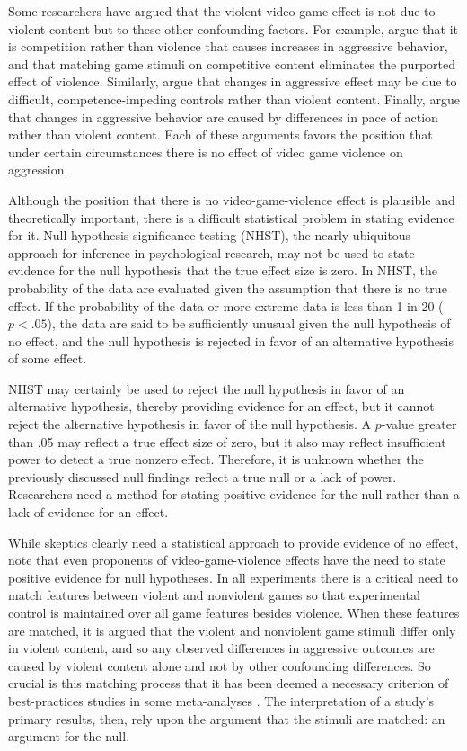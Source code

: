 \documentclass[man]{apa6}
\begin{document}
Some researchers have argued that the violent-video game effect is not due to violent content but to these other confounding factors.  For example, \citet{Adachi:Willoughby:2011} argue that it is competition rather than violence that causes increases in aggressive behavior, and that matching game stimuli on competitive content eliminates the purported effect of violence. Similarly, \citet{Przybylski:etal:2014} argue that changes in aggressive effect may be due to difficult, competence-impeding controls rather than violent content. Finally,  \citet{Elson:etal:2013} argue that changes in aggressive behavior are caused by differences in pace of action rather than violent content. Each of these arguments favors the position that under certain circumstances there is no effect of video game violence on aggression.

Although the position that there is no video-game-violence effect is plausible and theoretically important, there is a difficult statistical problem in stating evidence for it. Null-hypothesis significance testing (NHST), the nearly ubiquitous approach for inference in psychological research, may not be used to state evidence for the null hypothesis that the true effect size is zero.  In NHST, the probability of the data are evaluated given the assumption that there is no true effect. If the probability of the data or more extreme data is less than 1-in-20 ($p<.05$), the data are said to be sufficiently unusual given the null hypothesis of no effect, and the null hypothesis is rejected in favor of an alternative hypothesis of some effect.

NHST may certainly be used to reject the null hypothesis in favor of an alternative hypothesis, thereby providing evidence for an effect, but it cannot reject the alternative hypothesis in favor of the null hypothesis. A $p$-value greater than .05 may reflect a true effect size of zero, but it also may reflect insufficient power to detect a true nonzero effect. Therefore, it is unknown whether the previously discussed null findings reflect a true null or a lack of power.  Researchers need a method for stating positive evidence for the null rather than a lack of evidence for an effect. %

While skeptics clearly need a statistical approach to provide evidence of no effect, note that even proponents of video-game-violence effects have the need to state positive evidence for null hypotheses.  In all experiments there is a critical need to match features between violent and nonviolent games so that experimental control is maintained over all game features besides violence.  When these features are matched, it is argued that the violent and nonviolent game stimuli differ only in violent content, and so any observed differences in aggressive outcomes are caused by violent content alone and not by other confounding differences.  So crucial is this matching process that it has been deemed a necessary criterion of best-practices studies in some meta-analyses \citep{Anderson:etal:2010}. The interpretation of a study's primary results, then, rely upon the argument that the stimuli are matched: an argument for the null. 
\end{document}
